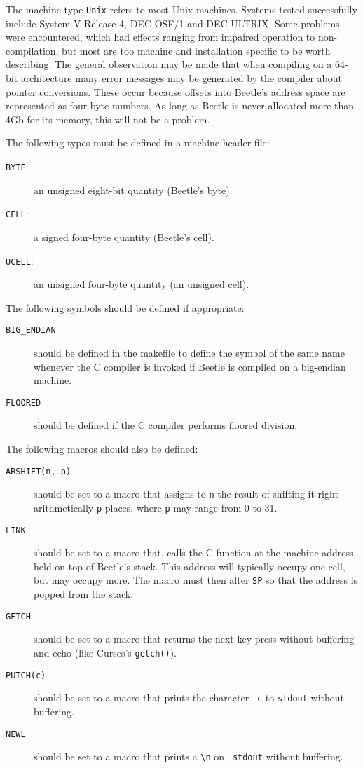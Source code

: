 The machine type {\tt Unix} refers to most Unix machines. Systems tested
successfully include System V Release 4, DEC OSF/1 and DEC ULTRIX. Some
problems were encountered, which had effects ranging from impaired operation
to non-compilation, but most are too machine and installation specific to be
worth describing. The general observation may be made that when compiling on
a 64-bit architecture many error messages may be generated by the
compiler about pointer conversions. These occur because offsets into Beetle's
address space are represented as four-byte numbers. As long as Beetle is
never allocated more than 4Gb for its memory, this will not be a problem.

The following types must be defined in a machine header file:

\begin{description}
\item[{\tt BYTE}:]an unsigned eight-bit quantity (Beetle's byte).
\item[{\tt CELL}:]a signed four-byte quantity (Beetle's cell).
\item[{\tt UCELL}:]an unsigned four-byte quantity (an unsigned cell).
\end{description}

The following symbols should be defined if appropriate:

\begin{description}
\item[{\tt BIG\_ENDIAN}] should be defined in the makefile to define the
symbol of the same name whenever the C compiler is invoked if Beetle is
compiled on a big-endian machine.
\item[{\tt FLOORED}]should be defined if the C compiler performs floored
division.
\end{description}

The following macros should also be defined:

\begin{description}
\item[{\tt ARSHIFT(n, p)}]should be set to a macro that assigns to {\tt n}
the result of shifting it right arithmetically {\tt p} places, where {\tt p}
may range from 0 to 31.
\item[{\tt LINK}]should be set to a macro that, calls the C function at the
machine address held on top of Beetle's stack. This address will typically
occupy one cell, but may occupy more. The macro must then alter {\tt SP} so
that the address is popped from the stack.
\item[{\tt GETCH}]should be set to a macro that returns the next key-press
without buffering and echo (like Curses's {\tt getch()}).
\item[{\tt PUTCH(c)}]should be set to a macro that prints the character {\tt
c} to {\tt stdout} without buffering.
\item[{\tt NEWL}]should be set to a macro that prints a \verb$\n$ on {\tt
stdout} without buffering.
\end{description}

